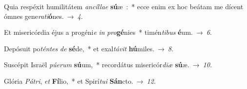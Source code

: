 ﻿\item Quia respéxit humilitátem \emph{an}\-\emph{cíl}\-\emph{lae} \textbf{sú}\-æ~:~*
ecce enim ex hoc beátam me dícent ómnes gene\emph{ra}\-\emph{ti}\-\textbf{ó}\-nes.~→~\emph{4}.
\item Et misericórdia éjus a progéni\emph{e} \emph{in} \emph{pro}\-\textbf{gé}\-nies~*
timén\emph{ti}\-\emph{bus} \textbf{é}\-um.~→~\emph{6}.
\item Depósuit po\emph{tén}\-\emph{tes} \emph{de} \textbf{sé}\-de,~*
et exal\emph{tá}\-\emph{vit} \textbf{hú}\-miles.~→~\emph{8}.
\item Suscépit Israël \emph{pú}\-\emph{e}\-\emph{rum} \textbf{sú}\-um,~*
recordátus misericór\emph{di}\-\emph{æ} \textbf{sú}\-æ.~→~\emph{10}.
\item Glória \emph{Pá}\-\emph{tri}, \emph{et} \textbf{Fí}\-lio,~*
et Spirí\emph{tu}\-\emph{i} \textbf{Sán}\-cto.~→~\emph{12}.
